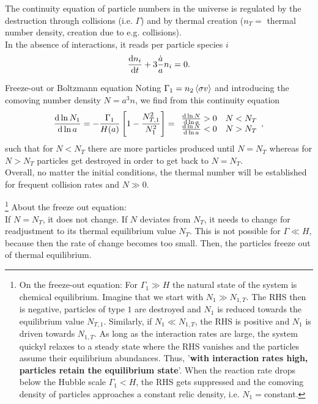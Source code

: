 The continuity equation of particle numbers in the universe is regulated by the destruction through collisions (i.e. $\Gamma$) and by thermal creation ($n_T=$ thermal number density, creation due to e.g. collisions).\\
In the absence of interactions, it reads per particle species $i$
\begin{equation}
\frac{\mathrm{d} n_i}{\mathrm{d} t} + 3 \frac{\dot{a}}{a} n_i=0.
\end{equation}
\begin{mybox}{Freeze-out or Boltzmann equation}
Noting $\Gamma_1=n_2 \expval{\sigma v}$ and introducing the comoving number density $N=a^3n$, we find from this continuity equation
\begin{equation}
\frac{\mathrm{d} \ln N_1}{\mathrm{d} \ln a} = - \frac{\Gamma_1}{H(a)}\left[1 -\frac{N^2_{T,1}}{N^2_1}\right] =\begin{array}{ll}
\frac{\mathrm{d} \ln N}{\mathrm{d} \ln a}>0 & N<N_T\\
\frac{\mathrm{d} \ln N}{\mathrm{d} \ln a} <0 & N>N_T\\
\end{array},
\end{equation}
such that for $N<N_T$ there are more particles produced until $N=N_T$ whereas for $N>N_T$ particles get destroyed in order to get back to $N=N_T$.\\
Overall, no matter the initial conditions, the thermal number will be established for frequent collision rates and $N\gg0$.
\end{mybox}
\footnote{On the freeze-out equation: For $\Gamma_1\gg H$ the natural state of the system is chemical equilibrium. Imagine that we start with $N_1 \gg N_{1,T}$. The RHS then is negative, particles of type $1$ are destroyed and $N_1$ is reduced towards the equilibrium value $N_{T,1}$. Similarly, if $N_1\ll N_{1,T}$, the RHS is positive and $N_1$ is driven towards $N_{1,T}$. As long as the interaction rates are large, the system quickyl relaxes to a steady state where the RHS vanishes and the particles assume their equilibrium abundances. Thus, ’\textbf{with interaction rates high, particles retain the equilibrium state}’. When the reaction rate drops below the Hubble scale $\Gamma_1 <H$, the RHS gets suppressed and the comoving density of particles approaches a constant relic density, i.e. $N_1=$constant.}
About the freeze out equation:\\
If $N=N_T$, it does not change. If $N$ deviates from $N_T$, it needs to change for readjustment to its thermal equilibrium value $N_T$. This is not possible for $\Gamma \ll H$, because then the rate of change becomes too small. Then, the particles freeze out of thermal equilibrium.\\
